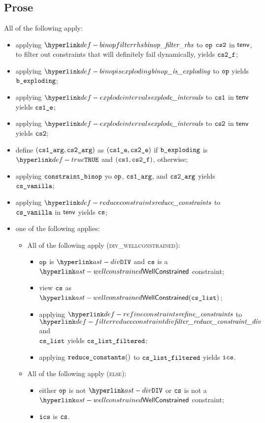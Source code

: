 \subsection{Prose}
All of the following apply:
\begin{itemize}
  \item applying $\binopfilterrhs$ to $\texttt{op}$ $\texttt{cs2}$ in $\textsf{tenv}$, to filter out constraints that will definitely fail dynamically, yields $\texttt{cs2\_f}$;
  \item applying $\binopisexploding$ to $\texttt{op}$ yields $\texttt{b\_exploding}$;
  \item applying $\explodeintervals$ to $\texttt{cs1}$ in $\textsf{tenv}$ yields $\texttt{cs1\_e}$;
  \item applying $\explodeintervals$ to $\texttt{cs2}$ in $\textsf{tenv}$ yields $\texttt{cs2}$;
  \item define $(\texttt{cs1\_arg}, \texttt{cs2\_arg})$ as $(\texttt{cs1\_e}, \texttt{cs2\_e})$ if $\texttt{b\_exploding}$ is $\True$ and $(\texttt{cs1}, \texttt{cs2\_f})$, otherwise;
  \item applying $\texttt{constraint\_binop}$ yo $\texttt{op}$, $\texttt{cs1\_arg}$, and $\texttt{cs2\_arg}$ yields $\texttt{cs\_vanilla}$;
  \item applying $\reduceconstraints$ to $\texttt{cs\_vanilla}$ in $\textsf{tenv}$ yields $\texttt{cs}$;
  \item one of the following applies:
  \begin{itemize}
    \item All of the following apply (\textsc{div\_wellconstrained}):
    \begin{itemize}
      \item $\texttt{op}$ is $\DIV$ and $\texttt{cs}$ is a $\wellconstrained$ constraint;
      \item view $\texttt{cs}$ as $\wellconstrained(\cslist)$;
      \item applying $\refineconstraints$ to $\filterreduceconstraintdiv$ and \\
            $\texttt{cs\_list}$ yields $\texttt{cs\_list\_filtered}$;
      \item applying $\reduceconstants$ to $\texttt{cs\_list\_filtered}$ yields $\texttt{ics}$.
    \end{itemize}

    \item All of the following apply (\textsc{else}):
    \begin{itemize}
      \item either $\texttt{op}$ is not $\DIV$ or $\texttt{cs}$ is not a $\wellconstrained$ constraint;
      \item $\texttt{ics}$ is $\texttt{cs}$.
    \end{itemize}
  \end{itemize}
\end{itemize}

